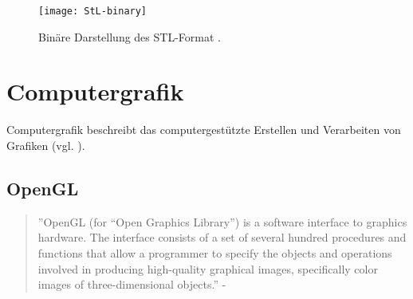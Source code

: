 \begin{figure}
	\centering
	\texttt{[image: StL-binary]}
	\caption{Binäre Darstellung des STL-Format \cite{STLFormat}.}
	\label{fig:BINARYSTL}
\end{figure}

\section{Computergrafik}
Computergrafik beschreibt das computergestützte Erstellen und Verarbeiten von Grafiken (vgl. \cite{ComputerGraphics}). 
\subsection{OpenGL}
\begin{quote}
	''OpenGL (for “Open Graphics Library”) is a software interface to graphics hardware.
	The interface consists of a set of several hundred procedures and functions
	that allow a programmer to specify the objects and operations involved in producing
	high-quality graphical images, specifically color images of three-dimensional
	objects.'' - \cite{OpenGLDoku}
\end{quote}
